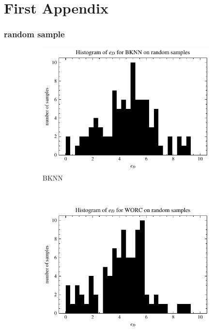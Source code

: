 \chapter{First Appendix}
\lipsum[1]


\subsection{random sample}

\begin{figure}[ht]
    \centering
    \begin{subfigure}[t]{0.5\textwidth}
        \centering
        \includegraphics[width=\textwidth]{chapters/figures/result_histograms/result_histogram_random_sample_workload_dist_error_BKNN.pdf}
        \captionsetup{width=.9\linewidth}
        \caption{BKNN}
    \end{subfigure}%
    ~ 
    \begin{subfigure}[t]{0.5\textwidth}
        \centering
        \includegraphics[width=\textwidth]{chapters/figures/result_histograms/result_histogram_random_sample_workload_dist_error_WORC.pdf}

\end{subfigure}
\end{figure}
